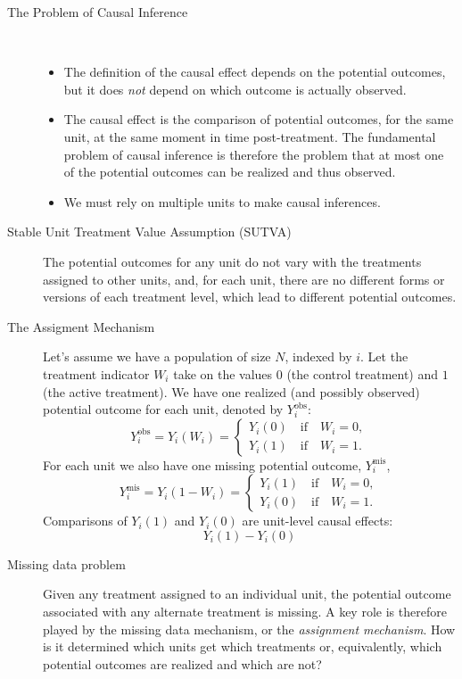 \documentclass[a4paper,10pt,landscape]{article}
\begin{document}
\begin{multicols*}{3}
\begin{description}
	\item[The Problem of Causal Inference] ~
	\begin{itemize}
		\item The definition of the causal effect depends on the potential outcomes, but it does {\it not} depend on which outcome is actually observed.
		\item The causal effect is the comparison of potential outcomes, for the same unit, at the same moment in time post-treatment. The fundamental problem of causal inference is therefore the problem that at most one of the potential outcomes can be realized and thus observed.
		\item We must rely on multiple units to make causal inferences.
	\end{itemize}
	\item[Stable Unit Treatment Value Assumption (SUTVA)]  The potential outcomes for any unit do not vary with the treatments assigned to other units, and, for each unit, there are no different forms or versions of each treatment level, which lead to different potential outcomes.
	\item[The Assigment Mechanism] Let's assume we have a population of size $N$, indexed by $i$. Let the treatment indicator $W_i$ take on the values $0$ (the control treatment) and $1$ (the active treatment). We have one realized (and possibly observed) potential outcome for each unit, denoted by $Y_i^\text{obs}$:
	\begin{equation*}
	Y_i^\text{obs}=Y_i\left(W_i\right)=
		\begin{cases}
			Y_i(0)\quad\text{if}\quad W_i=0,\\
			Y_i(1)\quad\text{if}\quad W_i=1.
		\end{cases}
	\end{equation*}
	For each unit we also have one missing potential outcome, $Y_i^\text{mis}$,
	\begin{equation*}
	Y_i^\text{mis}=Y_i\left(1-W_i\right)=
	\begin{cases}
	Y_i(1)\quad\text{if}\quad W_i=0,\\
	Y_i(0)\quad\text{if}\quad W_i=1.
	\end{cases}
	\end{equation*}
	Comparisons of $Y_i(1)$ and $Y_i(0)$ are {unit-level causal effects}: $$Y_i(1)-Y_i(0)$$
	\item[Missing data problem] Given any treatment assigned to an individual unit, the potential outcome associated with any alternate treatment is missing. A key role is therefore played by the missing data mechanism, or the {\it assignment mechanism}. How is it determined which units get which treatments or, equivalently, which potential outcomes are realized and which are not?

\end{description}
\end{multicols*}
\end{document}

